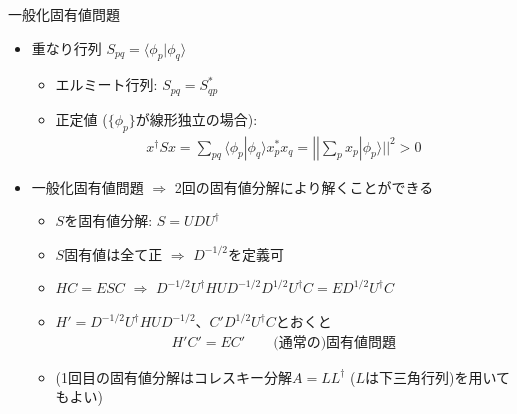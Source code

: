 
\begin{frame}[t,fragile]{一般化固有値問題}
  \begin{itemize}
  \item 重なり行列 $S_{pq} = \langle \phi_p | \phi_q \rangle$
    \begin{itemize}
      \item エルミート行列: $S_{pq} = S_{qp}^*$
      \item 正定値 ($\{\phi_p\}$が線形独立の場合):
        \begin{align*}
          x^\dagger S x = \sum_{pq} \langle \phi_p | \phi_q \rangle x_p^* x_q = || \sum_p x_p | \phi_p \rangle ||^2 > 0
        \end{align*}
    \end{itemize}
  \item 一般化固有値問題 $\Rightarrow$ 2回の固有値分解により解くことができる
    \begin{itemize}
      \item $S$を固有値分解: $S = U D U^\dagger$
      \item $S$固有値は全て正 $\Rightarrow$ $D^{-1/2}$を定義可
      \item $HC=ESC$ $\Rightarrow$ $D^{-1/2} U^\dagger H U D^{-1/2} D^{1/2} U^\dagger C = E D^{1/2} U^\dagger C$
      \item $H' = D^{-1/2} U^\dagger H U D^{-1/2}$、$C'D^{1/2} U^\dagger C$とおくと
        \begin{align*}
          H'C' = EC' \qquad \text{(通常の)固有値問題}
        \end{align*}
      \item (1回目の固有値分解はコレスキー分解$A=L L^\dagger$ ($L$は下三角行列)を用いてもよい)
    \end{itemize}
  \end{itemize}
\end{frame}
